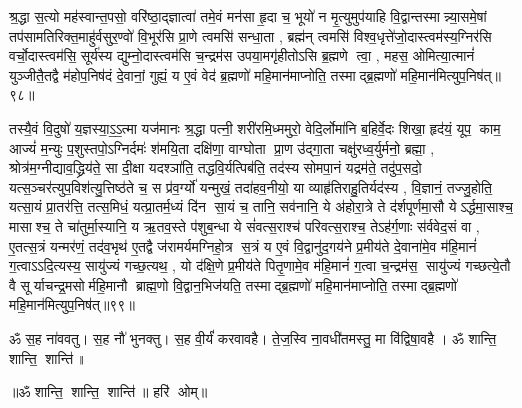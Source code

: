   श्र॒द्धा स॒त्यो मह॑स्वान्त॒पसो॒ वरि॑ष्ठा॒द्ज्ञात्वा॑ तमे॒वं मन॑सा हृ॒दा च॒ भूयो॑ न मृ॒त्युमुप॑याहि वि॒द्वान्तस्मान्न्या॒समे॒षां तप॑सामतिरिक्त॒माहु॑र्वसुर॒ण्वो॑ वि॒भूर॑सि प्रा॒णे त्वमसि॑ सन्धा॒ता \sep 
 ब्रह्म॑न् त्वमसि॑ विश्व॒धृत्ते॑जो॒दास्त्वम॑स्य॒ग्निर॑सि वर्चो॒दास्त्वम॑सि॒ सूर्य॑स्य द्युम्नो॒दास्त्वम॑सि च॒न्द्रम॑स उपया॒मगृ॑हीतोऽसि ब्र॒ह्मणे त्वा॒ \sep
 महस॒ ओमित्या॒त्मानं॑ युञ्जीतै॒तद्वै म॑होप॒निष॑दं दे॒वानां॒ गुह्यं॒ य ए॒वं वेद॑ ब्र॒ह्मणो॑ महि॒मान॑माप्नोति॒ तस्माद्ब्र॒ह्मणो॑ महि॒मान॑मित्युप॒निष॑त्॥९८॥\anuvakamend



तस्यै॒वं  वि॒दुषो॑ य॒ज्ञस्या॒ऽ॒ऽ॒त्मा यज॑मानः श्र॒द्धा पत्नी॒ शरी॑रमि॒ध्ममुरो॒ वेदि॒र्लोमा॑नि ब॒\ar{}हिर्वे॒दः शिखा॒ हृद॑यं॒ यूप॒ काम॒ आज्यं॑ म॒न्युः प॒शुस्तपो॒ऽग्निर्दमः॑ श॑मयि॒ता दक्षि॑णा॒ वाग्घोता प्रा॒ण उ॑द्गा॒ता चक्षु॑रध्व॒र्युर्मनो॒ ब्रह्मा॒ \sep 
श्रोत्र॑म॒ग्नीद्याव॒द्ध्रिय॑ते॒ सा दी॒क्षा यदश्ञा॑ति॒ तद्धवि॒र्यत्पिब॑ति॒ तद॑स्य सोमपा॒नं यद्रम॑ते॒ तदु॑प॒सदो॒ यत्स॒ञ्चर॑त्युप॒विश॑त्यु॒त्तिष्ठ॑ते च॒ स प्र॑व॒र्ग्यो॑ यन्मुखं॒ तदा॑हव॒नीयो॒ या व्याहृ॑तिराहु॒तिर्यद॑स्य \sep 
वि॒ज्ञानं॒ तज्जु॒होति॒ यत्सा॒यं प्रा॒तर॑त्ति॒ तत्स॒मिधं॒ यत्प्रा॒तर्म॒ध्यं दि॑न सा॒यं  च॒ तानि॒ सव॑नानि॒ ये अ॑होरा॒त्रे ते द॑र्\mbox{}शपूर्णमा॒सौ येऽर्द्धमा॒साश्च॒ मासाश्च॒ ते चा॑तुर्मा॒स्यानि॒ य ऋ॒तव॒स्ते प॑शुब॒न्धा ये सं॑वत्स॒राश्च॑ परिवत्स॒राश्च॒ तेऽह॑र्ग॒णाः स॑र्ववेद॒सं वा \sep 
ए॒तत्स॒त्रं यन्मर॑णं॒ तद॑व॒भृथ॑ ए॒तद्वै ज॑रामर्यमग्निहो॒त्र स॒त्रं य ए॒वं  वि॒द्वानु॑द॒गय॑ने प्र॒मीय॑ते दे॒वाना॑मे॒व म॑हि॒मानं॑ ग॒त्वाऽऽदि॒त्यस्य॒ सायु॑ज्यं गच्छ॒त्यथ॒ \sep
यो द॑क्षि॒णे प्र॒मीय॑ते पितृ॒णामे॒व म॑हि॒मानं॑ ग॒त्वा च॒न्द्रम॑स॒ सायु॑ज्यं गच्छत्ये॒तौ वै सूर्याचन्द्र॒मसोर्महि॒मानौ ब्राह्म॒णो वि॒द्वान॒भिज॑यति॒ तस्माद्ब्र॒ह्मणो॑ महि॒मान॑माप्नोति॒ तस्माद्ब्र॒ह्मणो॑ महि॒मान॑मित्युप॒निष॑त्॥९९॥
\anuvakamend

ॐ स॒ह ना॑ववतु। स॒ह नौ॑ भुनक्तु। स॒ह वी॒र्यं॑ करवावहै। ते॒ज॒स्वि ना॒वधी॑तमस्तु॒ मा वि॑द्विषा॒वहै। ॐ शान्ति॒ शान्ति॒ शान्ति॑॥

\centerline{॥ॐ शान्ति॒ शान्ति॒ शान्ति॑॥ हरि॑ ओम्॥}

\closesection
\clearpage
